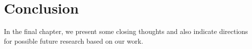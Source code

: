 
\chapter{Conclusion}\label{chapter:future_work_and_conclusion}

In the final chapter, we present some closing thoughts and also indicate directions for possible future research based on our work.






